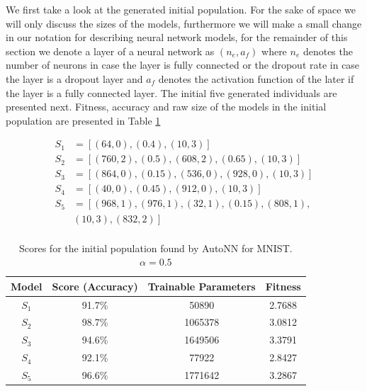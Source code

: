 \documentclass[journal]{IEEEtran}
\begin{document}
We first take a look at the generated initial population. For the sake of space we will only discuss the sizes of the models, furthermore we will make a small change in our notation for describing neural network models, for the remainder of this section we denote a layer of a neural network as $(n_e, a_f)$ where $n_e$ denotes the number of neurons in case the layer is fully connected or the dropout rate in case the layer is a dropout layer and $a_f$ denotes the activation function of the later if the layer is a fully connected layer. The initial five generated individuals are presented next. Fitness, accuracy and raw size of the models in the initial population are presented in Table \ref{table:autonn_mnist_initial}

\begin{align*}
S_1 & = \left[ (64, 0), (0.4), (10, 3) \right] \\
S_2 & = \left[ (760, 2), (0.5), (608, 2), (0.65), (10, 3) \right] \\
S_3 & = \left[ (864, 0), (0.15), (536, 0), (928, 0), (10, 3) \right] \\
S_4 & = \left[ (40,0), (0.45), (912, 0), (10, 3) \right] \\
S_5 & = \left[ (968, 1), (976, 1), (32, 1), (0.15), (808, 1), \right.\\
& \left. (10, 3), (832, 2) \right] \\
\end{align*}

\begin{table}[!htb]
\begin{center}
\begin{tabular}{| c | c | c | c |}
\hline
Model & Score (Accuracy) & Trainable Parameters & Fitness\\
\hline
$S_1$ & 91.7\% & 50890 & 2.7688\\
$S_2$ & 98.7\% & 1065378 & 3.0812\\
$S_3$ & 94.6\% & 1649506 & 3.3791\\
$S_4$ & 92.1\% & 77922 & 2.8427\\
$S_5$ & 96.6\% & 1771642 & 3.2867\\
\hline
\end{tabular}
\end{center}
\caption{Scores for the initial population found by AutoNN for MNIST. $\alpha = 0.5$}
\label{table:autonn_mnist_initial}
\end{table} 
\end{document}
